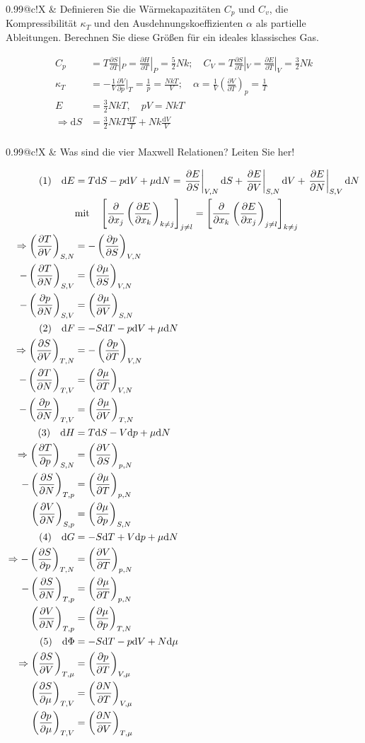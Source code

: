 \documentclass[a4paper,12pt]{scrartcl}
\makeatletter
\def\pf#1#2{\frac{\partial #1}{\partial #2}}		%
\def\ka#1{\left(#1\right)}				%
\def\rk{\right)}					%
\def\lk{\left(}						%
\def\rek{\right]}					%
\def\lek{\left[}					%
\def\d{\mathrm{d}}					%
\newcounter{qc}\setcounter{qc}{1}
\newenvironment{fshaded}{
\def\FrameCommand{\fcolorbox{framecolor}{shadecolor}}
\MakeFramed {\FrameRestore}}
{\endMakeFramed}
\def\frage#1{
\begin{fshaded}
\noindent
\begin{tabularx}{0.99\textwidth}{@{}c!{\color{framecolor}\vline}X}
{ \bf \rm \theqc }	&	\noindent #1
\end{tabularx}
\stepcounter{qc}
\end{fshaded}
}
\makeatother
\begin{document}
\frage{Definieren Sie die Wärmekapazitäten $C_p$ und $C_v$, die Kompressibilität $\kappa_T$ und den Ausdehnungskoeffizienten 
$\alpha$ als partielle Ableitungen. Berechnen Sie diese Größen für ein ideales klassisches Gas.}
\noindent
\begin{align*}
	C_p&=T\pf S T|_P=\pf H T|_P=\frac52Nk;\quad C_V=T\pf S T|_V=\pf E T|_V=\frac32Nk\\
	\kappa_T&=-\frac1V\pf V p|_T=\frac1p=\frac{NkT}V;\quad \alpha=\frac1V\lk{\pf V T}\rk_p=\frac1T\\
	E&=\frac32NkT,\quad pV=NkT\\
	\Rightarrow\d S&=\frac32NkT\frac{\d T}T+Nk\frac{\d V}V\qquad\\
\end{align*}

\frage{Was sind die vier Maxwell Relationen? Leiten Sie her!}
\noindent
\begin{align*}
	\text(1)\quad\d E&=T\d S-p\d V+\mu\d N=\left.{\pf ES}\right|_{V,N}\d S+\left.{\pf E V}\right|_{S,N}\d V+\left.{\pf 
EN}\right|_{S,V}\d N\\
	&\text{mit}\quad\lek{\pf{}{x_j} \lk{\pf E{x_k}}\rk_{k\neq j}}\rek _{j\neq l}=\lek{\pf{}{x_k} \lk{\pf E{x_j}}\rk_{j\neq 
l}}\rek _{k\neq j}\\
	\Rightarrow\ka{\pf T V}_{S,N}&=-\ka{\pf p S}_{V,N}\\
	-\ka{\pf T N}_{S,V}&=\ka{\pf \mu S}_{V,N}\\
	-\ka{\pf p N}_{S,V}&=\ka{\pf \mu V}_{S,N}\\
	\text(2)\quad\d F&=-S\d T-p\d V+\mu\d N\\
	\Rightarrow\ka{\pf S V}_{T,N}&=-\ka{\pf p T}_{V,N}\\
	-\ka{\pf T N}_{T,V}&=\ka{\pf \mu T}_{V,N}\\
	-\ka{\pf p N}_{T,V}&=\ka{\pf \mu V}_{T,N}\\
	\text(3)\quad\d H&=T\d S-V\d p+\mu\d N\\
	\Rightarrow\ka{\pf T p}_{S,N}&=\ka{\pf V S}_{p,N}\\
	-\ka{\pf S N}_{T,p}&=\ka{\pf \mu T}_{p,N}\\
	\ka{\pf V N}_{S,p}&=\ka{\pf \mu p}_{S,N}\\	
	\text(4)\quad\d G&=-S\d T+V\d p+\mu\d N\\
	\Rightarrow-\ka{\pf S p}_{T,N}&=\ka{\pf V T}_{p,N}\\
	-\ka{\pf S N}_{T,p}&=\ka{\pf \mu T}_{p,N}\\
	\ka{\pf V N}_{T,p}&=\ka{\pf \mu p}_{T,N}\\
	\text(5)\quad\d\Phi&=-S\d T-p\d V+N\d \mu\\
	\Rightarrow\ka{\pf S V}_{T,\mu}&=\ka{\pf p T}_{V,\mu}\\
	\ka{\pf S \mu}_{T,V}&=\ka{\pf N T}_{V,\mu}\\
	\ka{\pf p \mu}_{T,V}&=\ka{\pf N V}_{T,\mu}\\			
\end{align*}
\end{document}
